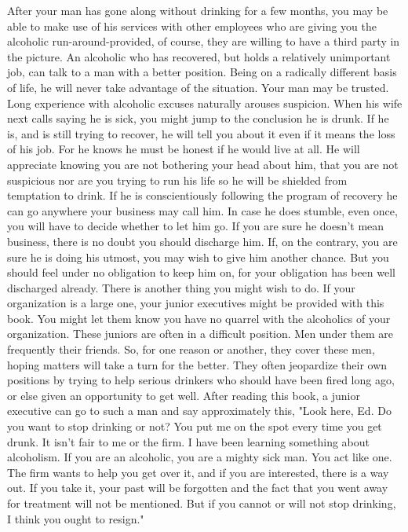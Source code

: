 \begin{biblechapter}
After your man has gone along without drinking for a few months, you may be able to make use of his services with other employees who are giving you the alcoholic run-around-provided, of course, they are willing to have a third party in the picture.  An alcoholic who has recovered, but holds a relatively unimportant job, can talk to a man with a better position.  Being on a radically different basis of life, he will never take advantage of the situation.
Your man may be trusted.  Long experience with alcoholic excuses naturally arouses suspicion.  When his wife next calls saying he is sick, you might jump to the conclusion he is drunk.  If he is, and is still trying to recover, he will tell you about it even if it means the loss of his job.  For he knows he must be honest if he would live at all.  He will appreciate knowing you are not bothering your head about him, that you are not suspicious nor are you trying to run his life so he will be shielded from temptation to drink.  If he is conscientiously following the program of recovery he can go anywhere your business may call him.
In case he does stumble, even once, you will have to decide whether to let him go.  If you are sure he doesn't mean business, there is no doubt you should discharge him.  If, on the contrary, you are sure he is doing his utmost, you may wish to give him another chance.  But you should feel under no obligation to keep him on, for your obligation has been well discharged already.
There is another thing you might wish to do.  If your organization is a large one, your junior executives might be provided with this book.  You might let them know you have no quarrel with the alcoholics of your organization.  These juniors are often in a difficult position.  Men under them are frequently their friends.  So, for one reason or another, they cover these men, hoping matters will take a turn for the better.  They often jeopardize their own positions by trying to help serious drinkers who should have been fired long ago, or else given an opportunity to get well.
After reading this book, a junior executive can go to such a man and say approximately this, "Look here, Ed.  Do you want to stop drinking or not?  You put me on the spot every time you get drunk.  It isn't fair to me or the firm.  I have been learning something about alcoholism.  If you are an alcoholic, you are a mighty sick man.  You act like one.  The firm wants to help you get over it, and if you are interested, there is a way out.  If you take it, your past will be forgotten and the fact that you went away for treatment will not be mentioned.  But if you cannot or will not stop drinking, I think you ought to resign."

\end{biblechapter}
